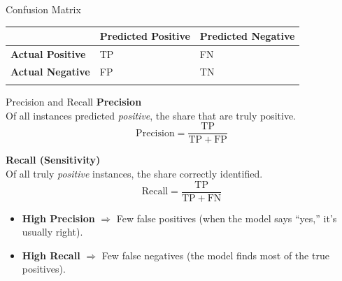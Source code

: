 \documentclass[
  ignorenonframetext,
]{beamer}
\providecommand{\tightlist}{%
  \setlength{\itemsep}{0pt}\setlength{\parskip}{0pt}}
\begin{document}
\begin{frame}{Confusion Matrix}
\label{confusion-matrix}
\begin{longtable}[]{@{}
  >{\raggedright\arraybackslash}p{}
  >{\raggedright\arraybackslash}p{}
  >{\raggedright\arraybackslash}p{}@{}}
\toprule\noalign{}
\begin{minipage}[b]{\linewidth}\raggedright
\end{minipage} & \begin{minipage}[b]{\linewidth}\raggedright
\textbf{Predicted Positive}
\end{minipage} & \begin{minipage}[b]{\linewidth}\raggedright
\textbf{Predicted Negative}
\end{minipage} \\
\midrule\noalign{}
\endhead
\textbf{Actual Positive} & TP & FN \\
\textbf{Actual Negative} & FP & TN \\
\bottomrule\noalign{}
\end{longtable}
\end{frame}

\begin{frame}{Precision and Recall}
\label{precision-and-recall}
\textbf{Precision}\\
Of all instances predicted \emph{positive}, the share that are truly
positive.\\
\[
\mathrm{Precision} = \frac{\mathrm{TP}}{\mathrm{TP} + \mathrm{FP}}
\]

\textbf{Recall (Sensitivity)}\\
Of all truly \emph{positive} instances, the share correctly
identified.\\
\[
\mathrm{Recall} = \frac{\mathrm{TP}}{\mathrm{TP} + \mathrm{FN}}
\]

\begin{itemize}
\tightlist
\item
  \textbf{High Precision} \(\Rightarrow\) Few false positives (when the
  model says ``yes,'' it's usually right).\\
\item
  \textbf{High Recall} \(\Rightarrow\) Few false negatives (the model
  finds most of the true positives).
\end{itemize}
\end{frame}
\end{document}
